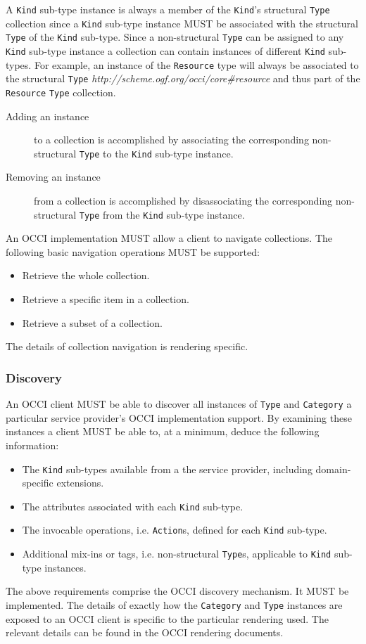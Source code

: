 \documentclass[10pt,a4paper,british]{article}
\newcommand{\hl}{\texttt}
\begin{document}
A \hl{Kind} sub-type instance is always a member of the \hl{Kind}'s structural
\hl{Type} collection since a \hl{Kind} sub-type instance MUST be associated
with the structural \hl{Type} of the \hl{Kind} sub-type.
Since a non-structural \hl{Type} can be assigned to any \hl{Kind} sub-type
instance a collection can contain instances of different \hl{Kind} sub-types.
%
For example, an instance of the \hl{Resource} type will always be associated
to the structural \hl{Type}
\textit{http://scheme.ogf.org/occi/core\#resource} and thus part of the
\hl{Resource} \hl{Type} collection.
\begin{description}
\item[Adding an instance] to a collection is accomplished by associating the
corresponding non-structural \hl{Type} to the \hl{Kind} sub-type instance.
\item[Removing an instance] from a collection is accomplished by disassociating the
corresponding non-structural \hl{Type} from the \hl{Kind} sub-type instance.
\end{description}
%
An OCCI implementation MUST allow a client to navigate collections. The
following basic navigation operations MUST be supported:
\begin{itemize}
\item Retrieve the whole collection.
\item Retrieve a specific item in a collection.
\item Retrieve a subset of a collection.
\end{itemize}
The details of collection navigation is rendering specific.

\subsubsection{Discovery}
\label{sec:discovery}
An OCCI client MUST be able to discover all instances of \hl{Type} and
\hl{Category} a particular service provider's OCCI implementation support. By
examining these instances a client MUST be able to, at a minimum, deduce the
following information:
\begin{itemize}
\item The \hl{Kind} sub-types available from a the service provider, including domain-specific extensions.
\item The attributes associated with each \hl{Kind} sub-type.
\item The invocable operations, i.e. \hl{Action}s, defined for each \hl{Kind} sub-type.
\item Additional mix-ins or tags, i.e. non-structural \hl{Type}s, applicable to
 \hl{Kind} sub-type instances.
\end{itemize}
The above requirements comprise the OCCI discovery mechanism. It MUST be
implemented.
%
The details of exactly how the \hl{Category} and \hl{Type} instances are
exposed to an OCCI client is specific to the particular rendering used.
The relevant details can be found in the OCCI rendering documents.
\end{document}

